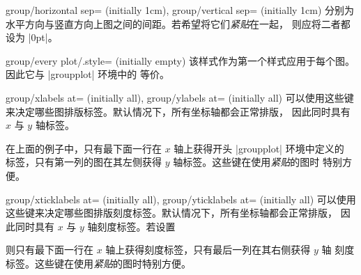 {\begin{pgfplotskeylist}{%
    group/horizontal sep= (initially 1cm),
    group/vertical sep= (initially 1cm)%
}
    分别为水平方向与竖直方向上图之间的间距。若希望将它们\textit{紧贴}在一起，
    则应将二者都设为 |0pt|。
\end{pgfplotskeylist}

\begin{pgfplotskey}{group/every plot/.style= (initially empty)}
    该样式作为第一个样式应用于每个图。因此它与 |groupplot| 环境中的
     等价。
\end{pgfplotskey}

\begin{pgfplotskeylist}{%
    group/xlabels at= (initially all),
    group/ylabels at= (initially all)%
}
    可以使用这些键来决定哪些图排版标签。默认情况下，所有坐标轴都会正常排版，
    因此同时具有 $x$ 与 $y$ 轴标签。
\begin{codeexample}[]
\end{codeexample}
    在上面的例子中，只有最下面一行在 $x$ 轴上获得开头 |groupplot| 环境中定义的
    标签，只有第一列的图在其左侧获得 $y$ 轴标签。这些键在使用\textit{紧贴}的图时
    特别方便。
\end{pgfplotskeylist}

\begin{pgfplotskeylist}{%
    group/xticklabels at= (initially all),
    group/yticklabels at= (initially all)%
}
    可以使用这些键来决定哪些图排版刻度标签。默认情况下，所有坐标轴都会正常排版，
    因此同时具有 $x$ 与 $y$ 轴刻度标签。若设置
\begin{codeexample}
\pgfplotsset{
    group/xticklabels at=edge bottom,
    group/yticklabels at=edge right,
}
\end{codeexample}
    则只有最下面一行在 $x$ 轴上获得刻度标签，只有最后一列在其右侧获得 $y$ 轴
    刻度标签。这些键在使用\textit{紧贴}的图时特别方便。


\end{pgfplotskeylist}}
